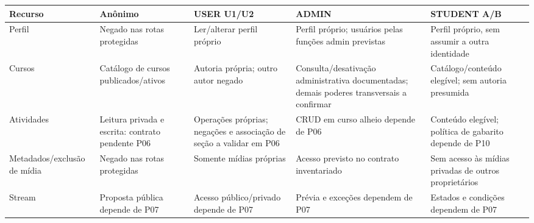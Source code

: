 {\def\LTcaptype{none} %
\begin{longtable}[]{@{}
  >{\raggedright\arraybackslash}p{}
  >{\raggedright\arraybackslash}p{}
  >{\raggedright\arraybackslash}p{}
  >{\raggedright\arraybackslash}p{}
  >{\raggedright\arraybackslash}p{}@{}}
\toprule\noalign{}
\begin{minipage}[b]{\linewidth}\raggedright
Recurso
\end{minipage} & \begin{minipage}[b]{\linewidth}\raggedright
Anônimo
\end{minipage} & \begin{minipage}[b]{\linewidth}\raggedright
USER U1/U2
\end{minipage} & \begin{minipage}[b]{\linewidth}\raggedright
ADMIN
\end{minipage} & \begin{minipage}[b]{\linewidth}\raggedright
STUDENT A/\allowbreak{}B
\end{minipage} \\
\midrule\noalign{}
\endhead
\bottomrule\noalign{}
\endlastfoot
Perfil & Negado nas rotas protegidas & Ler/\allowbreak{}alterar perfil próprio &
Perfil próprio; usuários pelas funções admin previstas & Perfil próprio,
sem assumir a outra identidade \\
Cursos & Catálogo de cursos publicados/\allowbreak{}ativos & Autoria própria; outro
autor negado & Consulta/\allowbreak{}desativação administrativa documentadas; demais
poderes transversais a confirmar & Catálogo/\allowbreak{}conteúdo elegível; sem
autoria presumida \\
Atividades & Leitura privada e escrita: contrato pendente P06 &
Operações próprias; negações e associação de seção a validar em P06 &
CRUD em curso alheio depende de P06 & Conteúdo elegível; política de
gabarito depende de P10 \\
Metadados/\allowbreak{}exclusão de mídia & Negado nas rotas protegidas & Somente
mídias próprias & Acesso previsto no contrato inventariado & Sem acesso
às mídias privadas de outros proprietários \\
Stream & Proposta pública depende de P07 & Acesso público/\allowbreak{}privado
depende de P07 & Prévia e exceções dependem de P07 & Estados e condições
dependem de P07 \\

\end{longtable}}
